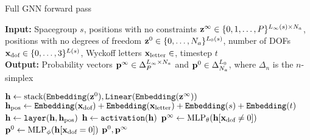 \begin{algorithm}[b]
   \caption{Full GNN forward pass}
   \label{algo:gnn_forward}
   \hspace*{\algorithmicindent} \textbf{Input:} Spacegroup $s$, positions with no constraints ${\mathbf{z}}^{\infty} \in \{0, 1, \dots, P\}^{L_{\infty}(s) \times N_a}$, positions with no degrees of freedom ${\mathbf{z}}^{0} \in \{0, \dots, N_a\}^{L_{0}(s)}$, number of DOFs ${\mathbf{x}}_\text{dof}\in \{0, \dots, 3\}^{L(s)}$, Wyckoff letters ${\mathbf{x}}_\text{letter} \in $, timestep $t$  \\
   \hspace*{\algorithmicindent} \textbf{Output:} Probability vectors ${\mathbf{p}}^{\infty} \in \Delta_{P}^{L_{\infty} \times N_a}$ and ${\mathbf{p}}^0 \in \Delta_{N_a}^{L_0}$, where $\Delta_n$ is the $n$-simplex
\begin{algorithmic}
\STATE ${\mathbf{h}} \gets \text{stack}(\mathtt{Embedding}({\mathbf{z}}^{0}), \mathtt{Linear}(\mathtt{Embedding}({\mathbf{z}}^{\infty}))$
\STATE ${\mathbf{h}}_\text{pos} \gets \mathtt{Embedding}({\mathbf{x}}_\text{dof}) + \mathtt{Embedding}({\mathbf{x}}_\text{letter}) + \mathtt{Embedding}(s) + \mathtt{Embedding}(t)$
\STATE ${\mathbf{h}} \gets \mathtt{layer}({\mathbf{h}}, {\mathbf{h}}_\text{pos})$ 
\STATE ${\mathbf{h}} \gets \mathtt{activation}({\mathbf{h}})$
\ENDFOR
\STATE ${\mathbf{p}}^{\infty} \gets \operatorname{MLP}_\theta({\mathbf{h}}[{\mathbf{x}}_\text{dof} \neq 0])$
\STATE ${\mathbf{p}}^0 \gets \operatorname{MLP}_\phi({\mathbf{h}}[{\mathbf{x}}_\text{dof} = 0])$
\RETURN ${\mathbf{p}}^0, {\mathbf{p}}^{\infty}$
\end{algorithmic}
\end{algorithm}
